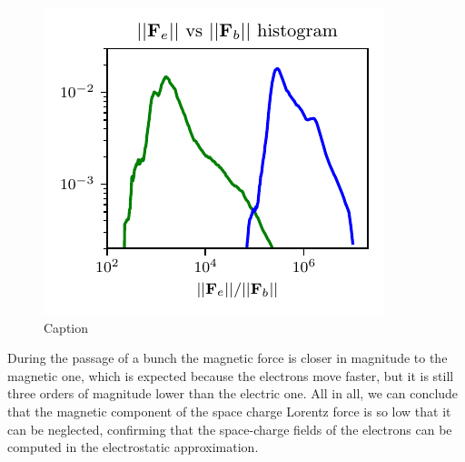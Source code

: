 \begin{figure}
    \centering
    \includegraphics[scale=1.4]{chapters/Chapter1/Figures/Fe_Fb_hist.pdf}
    \caption{Caption}
    \label{fig:Fe_vs_Fb_hist}
\end{figure}
During the passage of a bunch the magnetic force is closer in magnitude to the magnetic one, which is expected because the electrons move faster, but it is still three orders of magnitude lower than the electric one. All in all, we can conclude that the magnetic component of the space charge Lorentz force is so low that it can be neglected, confirming that the space-charge fields of the electrons can be computed in the electrostatic approximation.


